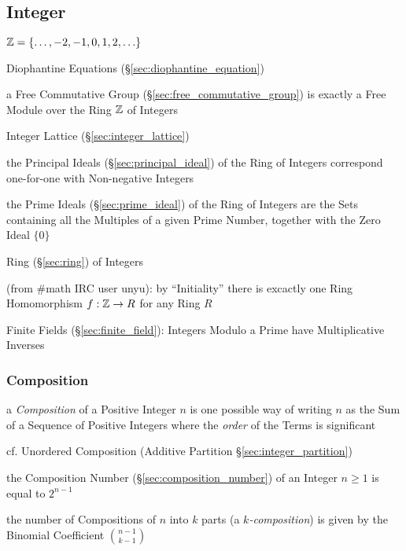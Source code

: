 \subsection{Integer}\label{sec:integer}

$\mathbb{Z} = \{ \ldots, -2, -1, 0, 1, 2, \ldots \}$

\fist Diophantine Equations (\S\ref{sec:diophantine_equation})

\fist a Free Commutative Group (\S\ref{sec:free_commutative_group}) is exactly a
Free Module over the Ring $\mathbb{Z}$ of Integers

\fist Integer Lattice (\S\ref{sec:integer_lattice})

the Principal Ideals (\S\ref{sec:principal_ideal}) of the Ring of Integers
correspond one-for-one with Non-negative Integers

the Prime Ideals (\S\ref{sec:prime_ideal}) of the Ring of Integers are the Sets
containing all the Multiples of a given Prime Number, together with the Zero
Ideal $\{0\}$

Ring (\S\ref{sec:ring}) of Integers

(from \#math IRC user unyu): by ``Initiality'' there is excactly one Ring
Homomorphism $f : \mathbb{Z} \rightarrow R$ for any Ring $R$

Finite Fields (\S\ref{sec:finite_field}): Integers Modulo a Prime have
Multiplicative Inverses



\subsubsection{Composition}\label{sec:integer_composition}

a \emph{Composition} of a Positive Integer $n$ is one possible way of writing
$n$ as the Sum of a Sequence of Positive Integers where the \emph{order} of the
Terms is significant

cf. Unordered Composition (Additive Partition \S\ref{sec:integer_partition})

the Composition Number (\S\ref{sec:composition_number}) of an Integer $n \geq 1$
is equal to $2^{n-1}$

the number of Compositions of $n$ into $k$ parts (a \emph{$k$-composition}) is
given by the Binomial Coefficient $\binom{n-1}{k-1}$



